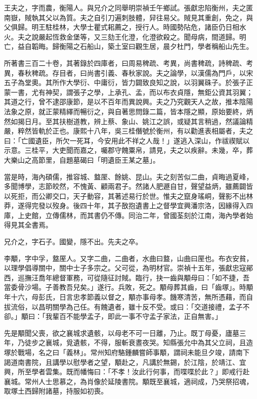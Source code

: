 \begin{pinyinscope}
王夫之，字而農，衡陽人。與兄介之同舉明崇禎壬午鄉試。張獻忠陷衡州，夫之匿南嶽，賊執其父以為質。夫之自引刀遍刺肢體，舁往易父。賊見其重創，免之，與父俱歸。明王駐桂林，大學士瞿式耜薦之，授行人。時國勢阽危，諸臣仍日相水火。夫之說嚴起恆救金堡等，又三劾王化澄，化澄欲殺之。聞母病，間道歸。明亡，益自韜晦。歸衡陽之石船山，築土室曰觀生居，晨夕杜門，學者稱船山先生。

所著書三百二十卷，其著錄於四庫者，曰周易稗疏、考異，尚書稗疏，詩稗疏、考異，春秋稗疏。存目者，曰尚書引義、春秋家說。夫之論學，以漢儒為門戶，以宋五子為堂奧。其所作大學衍、中庸衍，皆力闢致良知之說，以羽翼硃子。於張子正蒙一書，尤有神契，謂張子之學，上承孔、孟，而以布衣貞隱，無鉅公資其羽翼；其道之行，曾不逮邵康節，是以不百年而異說興。夫之乃究觀天人之故，推本陰陽法象之原，就正蒙精繹而暢衍之，與自著思問錄二篇，皆本隱之顯，原始要終，炳然如揭日月。至其扶樹道教，辨上蔡、象山、姚江之誤，或疑其言稍過，然議論精嚴，粹然皆軌於正也。康熙十八年，吳三桂僭號於衡州，有以勸進表相屬者，夫之曰：「亡國遺臣，所欠一死耳，今安用此不祥之人哉！」遂逃入深山，作祓禊賦以示意。三桂平，大吏聞而嘉之，囑郡守餽粟帛，請見，夫之以疾辭。未幾，卒，葬大樂山之高節里，自題墓碣曰「明遺臣王某之墓」。

當是時，海內碩儒，推容城、盩厔、餘姚、昆山。夫之刻苦似二曲，貞晦過夏峰，多聞博學，志節皎然，不愧黃、顧兩君子。然諸人肥遯自甘，聲望益炳，雖薦闢皆以死拒，而公卿交口，天子動容，其著述易行於世。惟夫之竄身瑤峒，聲影不出林莽，遂得完發以歿身。後四十年，其子敔抱遺書上之督學宜興潘宗洛，因緣得入四庫，上史館，立傳儒林，而其書仍不傳。同治二年，曾國荃刻於江南，海內學者始得見其全書焉。

兄介之，字石子。國變，隱不出。先夫之卒。

李顒，字中孚，盩厔人。又字二曲，二曲者，水曲曰盩，山曲曰厔也。布衣安貧，以理學倡導關中，關中士子多宗之。父可從，為明材官。崇禎十五年，張獻忠寇鄖西，巡撫汪喬年總督軍務，可從隨征討賊。臨行，抉一齒與顒母曰：「如不捷，吾當委骨沙場。子善教吾兒矣。」遂行。兵敗，死之。顒母葬其齒，曰「齒塚」。時顒年十六，母彭氏，日言忠孝節義以督之，顒亦事母孝。饑寒清苦，無所憑藉，而自拔流俗，以昌明關學為己任。有餽遺者，雖十反不受。或曰：「交道接禮，孟子不卻。」顒曰：「我輩百不能學孟子，即此一事不守孟子家法，正自無害。」

先是顒聞父喪，欲之襄城求遺骸，以母老不可一日離，乃止。既丁母憂，廬墓三年，乃徒步之襄城，覓遺骸，不得，服斬衰晝夜哭。知縣張允中為其父立祠，且造塚於戰場，名之曰「義林」。常州知府駱鍾麟嘗師事顒，謂祠未能旦夕竣，請南下謁道南書院，且講學以慰學者之望，顒赴之，凡講於無錫，於江陰，於靖江、宜興，所至學者雲集。既而幡悔曰：「不孝！汝此行何事，而喋喋於此？」即戒行赴襄城。常州人士思慕之，為肖像於延陵書院。顒既至襄城，適祠成，乃哭祭招魂，取塚土西歸附諸墓，持服如初喪。


\end{pinyinscope}
